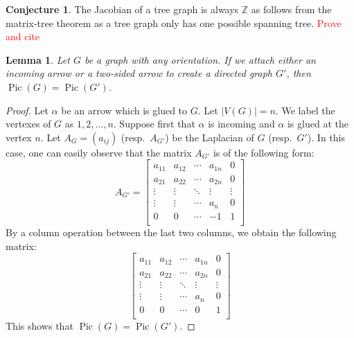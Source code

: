 \documentclass[11pt,reqno]{amsart}
\DeclareMathOperator{\Pic}{Pic}
\theoremstyle{definition}
\newtheorem{conj}[mydef]{\textbf{Conjecture}}
\theoremstyle{plain}
\newtheorem{lem}[mydef]{\textbf{Lemma}}
\begin{document}
	\begin{conj}
		The Jacobian of a tree graph is always $\mathbb{Z}$ as follows from the matrix-tree theorem as a
		tree graph only has one possible spanning tree. \textcolor{red}{Prove and cite}
	\end{conj}

	\begin{lem}
		Let $G$ be a graph with any orientation. If we attach either an incoming arrow or a two-sided
		arrow to create a directed graph $G'$, then $\Pic(G)=\Pic(G')$. \label{proposition: gluing an arrow proposition}
	\end{lem}
	\begin{proof}
		Let $\alpha$ be an arrow which is glued to $G$. Let $|V(G)|=n$. We label the vertexes of
		$G$ as $1,2,\dots,n$. Suppose first that $\alpha$ is incoming and $\alpha$ is glued at the vertex $n$.
		Let $A_G=(a_{ij})$ (resp.~$A_{G'}$) be the Laplacian of $G$ (resp.~$G'$). In this case, one can easily
		observe that the matrix $A_{G'}$ is of the following form:
		\begin{equation}
			A_{G'}=\left[\begin{array}{ccc|c|c}
				a_{11}&a_{12}&\cdots &a_{1n}&0\\
				a_{21}&a_{22}&\cdots &a_{2n}&0\\
				\vdots & \vdots &\ddots & \vdots & \vdots \\ \hline
					\vdots & \vdots & \cdots&a_n & 0\\ \hline
				0&0&\cdots &-1&1\\
			\end{array}\right]
		\end{equation}
		By a column operation between the last two columns, we obtain the following matrix:
		\begin{equation}\label{eq: arrow adding matrix}
			\left[\begin{array}{ccc|c|c}
				a_{11}&a_{12}&\cdots &a_{1n}&0\\
				a_{21}&a_{22}&\cdots &a_{2n}&0\\
				\vdots & \vdots &\ddots & \vdots & \vdots \\ \hline
				\vdots & \vdots & \cdots&a_n & 0\\ \hline
				0&0&\cdots &0&1\\
			\end{array}\right]
		\end{equation}
		This shows that $\Pic(G)=\Pic(G')$.


\end{proof}
\end{document}
